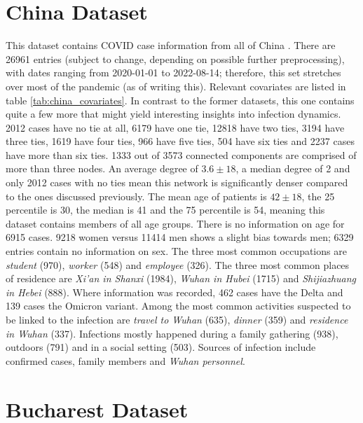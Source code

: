 \section{China Dataset}
\label{sec:china_data}

This dataset contains COVID case information from all of China \cite{china_publication,china_data}. There are 26961 entries (subject to change, depending on possible further preprocessing), with dates ranging from 2020-01-01 to 2022-08-14; therefore, this set stretches over most of the pandemic (as of writing this). Relevant covariates are listed in table \ref{tab:china_covariates}. In contrast to the former datasets, this one contains quite a few more that might yield interesting insights into infection dynamics. 2012 cases have no tie at all, 6179 have one tie, 12818 have two ties, 3194 have three ties, 1619 have four ties, 966 have five ties, 504 have six ties and 2237 cases have more than six ties. 1333 out of 3573 connected components are comprised of more than three nodes. An average degree of $3.6\pm18$, a median degree of 2 and only 2012 cases with no ties mean this network is significantly denser compared to the ones discussed previously. The mean age of patients is $42\pm18$, the 25 percentile is 30, the median is 41 and the 75 percentile is 54, meaning this dataset contains members of all age groups. There is no information on age for 6915 cases. 9218 women versus 11414 men shows a slight bias towards men; 6329 entries contain no information on sex. The three most common occupations are \emph{student} (970), \emph{worker} (548) and \emph{employee} (326). The three most common places of residence are \emph{Xi'an in Shanxi} (1984), \emph{Wuhan in Hubei} (1715) and \emph{Shijiazhuang in Hebei} (888). Where information was recorded, 462 cases have the Delta and 139 cases the Omicron variant. Among the most common activities suspected to be linked to the infection are \emph{travel to Wuhan} (635), \emph{dinner} (359) and \emph{residence in Wuhan} (337). Infections mostly happened during a family gathering (938), outdoors (791) and in a social setting (503). Sources of infection include confirmed cases, family members and \emph{Wuhan personnel}.

\section{Bucharest Dataset}
\label{sec:bucharest_dataset}

